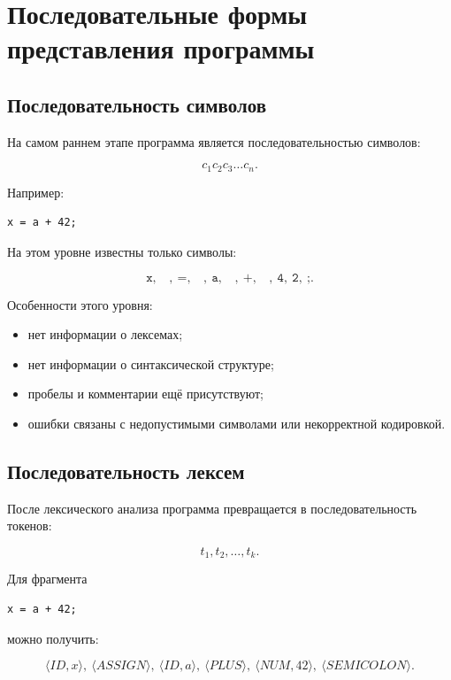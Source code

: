 \documentclass[12pt,a4paper]{article}
\begin{document}
\section{Последовательные формы представления программы}

\subsection{Последовательность символов}

На самом раннем этапе программа является последовательностью символов:

\[
c_1 c_2 c_3 \ldots c_n.
\]

Например:

\begin{lstlisting}
x = a + 42;
\end{lstlisting}

На этом уровне известны только символы:

\[
\texttt{x},\ \texttt{ },\ \texttt{=},\ \texttt{ },\ \texttt{a},\ \texttt{ },\ \texttt{+},\ \texttt{ },\ \texttt{4},\ \texttt{2},\ \texttt{;}.
\]

Особенности этого уровня:
\begin{itemize}
    \item нет информации о лексемах;
    \item нет информации о синтаксической структуре;
    \item пробелы и комментарии ещё присутствуют;
    \item ошибки связаны с недопустимыми символами или некорректной кодировкой.
\end{itemize}

\subsection{Последовательность лексем}

После лексического анализа программа превращается в последовательность токенов:

\[
t_1,t_2,\ldots,t_k.
\]

Для фрагмента

\begin{lstlisting}
x = a + 42;
\end{lstlisting}

можно получить:

\[
\langle ID,x\rangle,\
\langle ASSIGN\rangle,\
\langle ID,a\rangle,\
\langle PLUS\rangle,\
\langle NUM,42\rangle,\
\langle SEMICOLON\rangle.
\]
\end{document}
